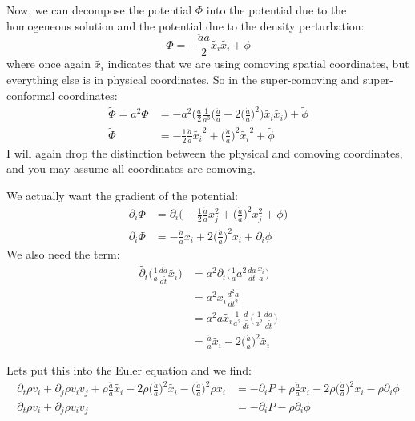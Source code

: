 \documentclass{article}
\newcommand{ \wt }{\widetilde}
\begin{document}
Now, we can decompose the potential $\Phi$ into the potential due to the homogeneous solution and the potential due to the density perturbation:
\begin{equation}
  \Phi = -\frac{\ddot{a}a}{2} \wt{x_i}\wt{x_i} + \phi
\end{equation}
where once again $\wt{x_i}$ indicates that we are using comoving spatial coordinates, but everything else is in physical coordinates.  So in the super-comoving and super-conformal coordinates:
\begin{align*} 
  \wt{\Phi} = a^{2}\Phi &=- a^{2} \bigg( \frac{a}{2}\frac{1}{a^3} \bigg( \frac{\ddot{a}}{a}  - 2 \bigg( \frac{\dot{a}}{a}\bigg)^2\bigg)  \wt{x_i}\wt{x_i}\bigg) + \wt{\phi} \\
  \wt{\Phi} &= -\frac{1}{2} \frac{\ddot{a}}{a}\wt{x_i}^2 +\bigg(\frac{\dot{a}}{a}\bigg)^2\wt{x_i}^2 +\wt{\phi} 
\end{align*}
I will again drop the distinction between the physical and comoving coordinates, and you may assume all coordinates are comoving.

We actually want the gradient of the potential:
\begin{align*}
  \partial_i \Phi &= \partial_i \bigg( -\frac{1}{2} \frac{\ddot{a}}{a}x_j^2 +\bigg(\frac{\dot{a}}{a}\bigg)^2x_j^2 +\phi \bigg)\\
  \partial_i \Phi &= -\frac{\ddot{a}}{a} x_i + 2 \bigg(\frac{\dot{a}}{a}  \bigg)^2 x_i + \partial_i \phi
\end{align*}
We also need the term:
\begin{align*}
 \wt{ \partial_t}\bigg( \frac{1}{a}\frac{da}{d\wt{t}} \wt{x_i} \bigg) &= a^2 \partial_t \bigg( \frac{1}{a} a^2 \frac{da}{dt} \frac{x_i}{a} \bigg)\\
&=a^2 x_i \frac{d^2a}{dt^2} \\
&= a^2 a \wt{x_i} \frac{1}{a^2} \frac{d}{d\wt{t}}\bigg( \frac{1}{a^2} \frac{da}{d\wt{t}} \bigg) \\
&= \frac{\ddot{a}}{a} \wt{x_i} - 2 \bigg( \frac{\dot{a}}{a} \bigg)^2 \wt{x_i} 
\end{align*}


Lets put this into the Euler equation and we find:
\begin{align*}
\partial_t \rho v_i + \partial_j \rho v_i v_j + \rho
  \frac{\ddot{a}}{a} \wt{x_i} - 2 \rho \bigg( \frac{\dot{a}}{a}
  \bigg)^2 \wt{x_i}  - \bigg( \frac{\dot{a}}{a} \bigg)^2 \rho x_i 
 &= - \partial_i P +\rho\frac{\ddot{a}}{a} x_i  -
   2\rho\bigg(\frac{\dot{a}}{a}\bigg)^2x_i-\rho \partial_i \phi\\
\partial_t \rho v_i + \partial_j \rho v_i v_j &= -\partial_i P -
                                                \rho \partial_i \phi
\end{align*}
\end{document}
